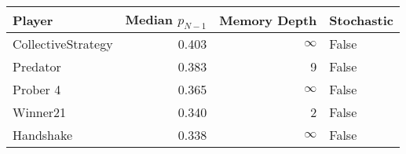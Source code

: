 \begin{tabular}{lrrl}
\toprule
             Player &  Median $p_{N-1}$ &  Memory Depth & Stochastic \\
\midrule
 CollectiveStrategy &             0.403 &            \(\infty\) &      False \\
           Predator &             0.383 &             9 &      False \\
           Prober 4 &             0.365 &            \(\infty\) &      False \\
           Winner21 &             0.340 &             2 &      False \\
          Handshake &             0.338 &            \(\infty\) &      False \\
\bottomrule
\end{tabular}
